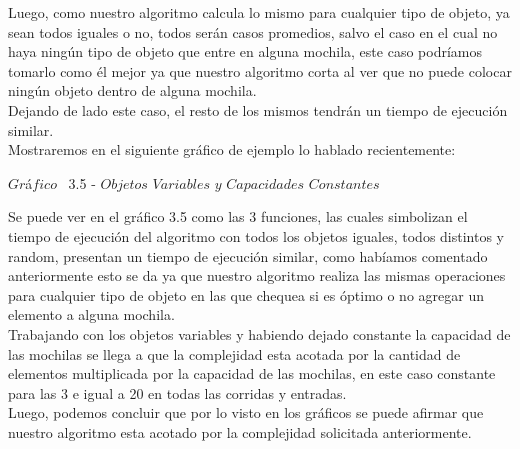 Luego, como nuestro algoritmo calcula lo mismo para cualquier tipo de objeto, ya sean todos iguales o no, todos ser\'an casos promedios, salvo el caso en el cual no haya ning\'un tipo de objeto que entre en alguna mochila, este caso podr\'iamos tomarlo como \'el mejor ya que nuestro algoritmo corta al ver que no puede colocar ning\'un objeto dentro de alguna mochila.\\
Dejando de lado este caso, el resto de los mismos tendr\'an un tiempo de ejecuci\'on similar.\\

Mostraremos en el siguiente gr\'afico de ejemplo lo hablado recientemente:\\

\vspace*{0.3cm} \vspace*{0.3cm}
  \begin{center}
  {$Gr$\'a$fico$ \ 3.5 - $Objetos$ $Variables$ $y$ $Capacidades$ $Constantes$}
  \end{center}
  \vspace*{0.3cm}
  
Se puede ver en el gr\'afico 3.5 como las 3 funciones, las cuales simbolizan el tiempo de ejecuci\'on del algoritmo con todos los objetos iguales, todos distintos y random, presentan un tiempo de ejecuci\'on similar, como hab\'iamos comentado anteriormente esto se da ya que nuestro algoritmo realiza las mismas operaciones para cualquier tipo de objeto en las que chequea si es \'optimo o no agregar un elemento a alguna mochila.\\

Trabajando con los objetos variables y habiendo dejado constante la capacidad de las mochilas se llega a que la complejidad esta acotada por la cantidad de elementos multiplicada por la capacidad de las mochilas, en este caso constante para las 3 e igual a 20 en todas las corridas y entradas.\\

Luego, podemos concluir que por lo visto en los gr\'aficos se puede afirmar que nuestro algoritmo esta acotado por la complejidad solicitada anteriormente.\\